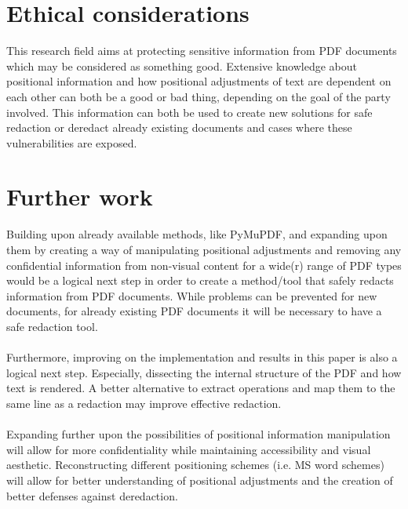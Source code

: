 \section{Ethical considerations}
This research field aims at protecting sensitive information from PDF documents which may be considered as something good. Extensive knowledge about positional information and how positional adjustments of text are dependent on each other can both be a good or bad thing, depending on the goal of the party involved. This information can both be used to create new solutions for safe redaction or deredact already existing documents and cases where these vulnerabilities are exposed. 

\section{Further work}
Building upon already available methods, like PyMuPDF, and expanding upon them by creating a way of manipulating positional adjustments and removing any confidential information from non-visual content for a wide(r) range of PDF types would be a logical next step in order to create a method/tool that safely redacts information from PDF documents. While problems can be prevented for new documents, for already existing PDF documents it will be necessary to have a safe redaction tool.
\\\\
Furthermore, improving on the implementation and results in this paper is also a logical next step. Especially, dissecting the internal structure of the PDF and how text is rendered. A better alternative to extract operations and map them to the same line as a redaction may improve effective redaction. 
\\\\
Expanding further upon the possibilities of positional information manipulation will allow for more confidentiality while maintaining accessibility and visual aesthetic. Reconstructing different positioning schemes (i.e. MS word schemes) will allow for better understanding of positional adjustments and the creation of better defenses against deredaction.
